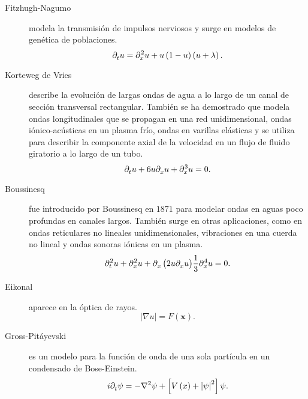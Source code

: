 \begin{description}
	\item[Fitzhugh-Nagumo]
	      modela la transmisión de impulsos nerviosos y surge en
	      modelos de genética de poblaciones.
	      \begin{equation*}
		      \difcp{u}{t}=
		      \difcp[2]{u}{x}+
		      u\left(1-u\right)
		      \left(u+\lambda\right).
	      \end{equation*}

	\item[Korteweg de Vries]
	      describe la evolución de largas ondas de agua a lo largo de
	      un canal de sección transversal rectangular.
	      También se ha demostrado que modela ondas longitudinales
	      que se propagan en una red unidimensional, ondas
	      iónico-acústicas en un plasma frío, ondas en varillas
	      elásticas y se utiliza para describir la componente axial
	      de la velocidad en un flujo de fluido giratorio a lo largo de
	      un tubo.
	      \begin{equation*}
		      \difcp{u}{t}+
		      6u\difcp{u}{x}+
		      \difcp[3]{u}{x}=
		      0.
	      \end{equation*}

	\item[Boussinesq]
	      fue introducido por Boussinesq en $1871$ para modelar ondas
	      en aguas poco profundas en canales largos.
	      También surge en otras aplicaciones, como en ondas
	      reticulares no lineales unidimensionales, vibraciones en una
	      cuerda no lineal y ondas sonoras iónicas en un plasma.
	      \begin{equation*}
		      \difcp[2]{u}{t}+
		      \difcp[2]{u}{x}+
		      \difcp{\left(2u\difcp{u}{x}\right)}{x}
		      \frac{1}{3}\difcp[4]{u}{x}=
		      0.
	      \end{equation*}

	\item[Eikonal]
	      aparece en la óptica de rayos.
	      \begin{equation*}
		      \left|\nabla u\right|=
		      F\left(\symbf{x}\right).
	      \end{equation*}

	\item[Gross-Pitáyevski]
	      es un modelo para la función de onda de una sola partícula
	      en un condensado de Bose-Einstein.
	      \begin{equation*}
		      i\difcp{\psi}{t}=
		      -\nabla^{2}\psi+
		      \left[
		      V\left(x\right)+
		      {\left|\psi\right|}^{2}
		      \right]
		      \psi.
	      \end{equation*}


\end{description}
